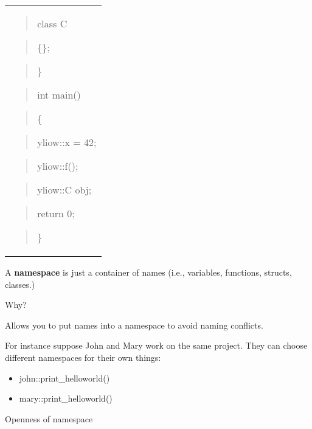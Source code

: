 \documentclass[
]{article}
\providecommand{\tightlist}{%
  \setlength{\itemsep}{0pt}\setlength{\parskip}{0pt}}
\begin{document}
\begin{longtable}[]{@{}
  >{\raggedright\arraybackslash}p{}@{}}
\begin{quote}
class C
\end{quote}

\begin{quote}
\{\};
\end{quote}

\begin{quote}
\}
\end{quote}

\begin{quote}
\end{quote}

\begin{quote}
int main()
\end{quote}

\begin{quote}
\{
\end{quote}

\begin{quote}
yliow::x = 42;
\end{quote}

\begin{quote}
yliow::f();
\end{quote}

\begin{quote}
yliow::C obj;
\end{quote}

\begin{quote}
return 0;
\end{quote}

\begin{quote}
\}
\end{quote} \\
\end{longtable}

A \textbf{namespace} is just a container of names (i.e., variables,
functions, structs, classes.)

Why?

Allows you to put names into a namespace to avoid naming conflicts.

For instance suppose John and Mary work on the same project. They can
choose different namespaces for their own things:

\begin{itemize}
\tightlist
\item
  john::print\_helloworld()
\item
  mary::print\_helloworld()
\end{itemize}

Openness of namespace
\end{document}

